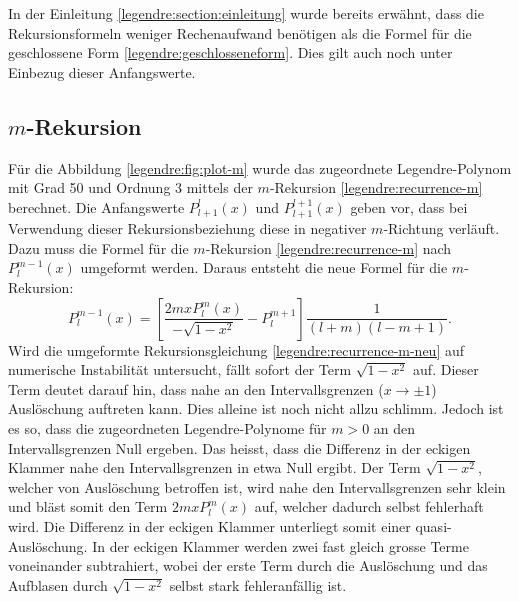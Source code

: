 In der Einleitung \ref{legendre:section:einleitung} wurde bereits erwähnt, dass die Rekursionsformeln weniger Rechenaufwand benötigen als die Formel für die geschlossene Form \eqref{legendre:geschlosseneform}.
Dies gilt auch noch unter Einbezug dieser Anfangswerte.

\subsection{$m$-Rekursion
\label{legendre:subsection:mrichtung}}
Für die Abbildung \ref{legendre:fig:plot-m} wurde das zugeordnete Legendre-Polynom mit Grad 50 und Ordnung 3 mittels der $m$-Rekursion \eqref{legendre:recurrence-m} berechnet.
Die Anfangswerte $P^{l}_{l+1}(x)$ und $P^{l+1}_{l+1}(x)$ geben vor, dass bei Verwendung dieser Rekursionsbeziehung diese in negativer $m$-Richtung verläuft.
Dazu muss die Formel für die $m$-Rekursion \eqref{legendre:recurrence-m} nach $P^{m-1}_{l}(x)$ umgeformt werden.
Daraus entsteht die neue Formel für die $m$-Rekursion:  
\begin{equation}
P^{m-1}_{l}(x)
= \left[ \frac{2mxP^{m}_{l}(x)}{- \sqrt{1-x^2}}-P^{m+1}_{l} \right]
\frac{1}{(l+m)(l-m+1)} .
\label{legendre:recurrence-m-neu}
\end{equation}
Wird die umgeformte Rekursionsgleichung \eqref{legendre:recurrence-m-neu} auf numerische Instabilität untersucht, fällt sofort der Term $\sqrt{1-x^2}$ auf.
Dieser Term deutet darauf hin, dass nahe an den Intervallsgrenzen ($x \rightarrow \pm 1$) Auslöschung auftreten kann.
%
Dies alleine ist noch nicht allzu schlimm.
Jedoch ist es so, dass die zugeordneten Legendre-Polynome für $m>0$ an den Intervallsgrenzen Null ergeben.
Das heisst, dass die Differenz in der eckigen Klammer nahe den Intervallsgrenzen in etwa Null ergibt.
Der Term $\sqrt{1-x^2}$, welcher von Auslöschung betroffen ist, wird nahe den Intervallsgrenzen sehr klein und bläst somit den Term $2mxP^{m}_{l}(x)$ auf, welcher dadurch selbst fehlerhaft wird.
Die Differenz in der eckigen Klammer unterliegt somit einer quasi-Auslöschung.
In der eckigen Klammer werden zwei fast gleich grosse Terme voneinander subtrahiert, wobei der erste Term durch die Auslöschung und das Aufblasen durch $\sqrt{1-x^2}$ selbst stark fehleranfällig ist.

